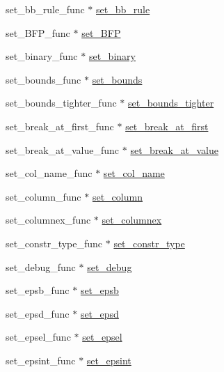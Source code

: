 \begin{DoxyCompactItemize}
\item 
set\+\_\+bb\+\_\+rule\+\_\+func $\ast$ \hyperlink{struct__lprec_ad044e985657bda301e0c0d58c9542f8a}{set\+\_\+bb\+\_\+rule}
\item 
set\+\_\+\+B\+F\+P\+\_\+func $\ast$ \hyperlink{struct__lprec_adceffb271a5c8da2ca201c1030ceb014}{set\+\_\+\+B\+FP}
\item 
set\+\_\+binary\+\_\+func $\ast$ \hyperlink{struct__lprec_a411a10c4f2515e989baddf7dbc456e20}{set\+\_\+binary}
\item 
set\+\_\+bounds\+\_\+func $\ast$ \hyperlink{struct__lprec_a192bb46bdeb1b1ecf686295bda2929a1}{set\+\_\+bounds}
\item 
set\+\_\+bounds\+\_\+tighter\+\_\+func $\ast$ \hyperlink{struct__lprec_a05b16e66be5410ff7cb703bf385b66d3}{set\+\_\+bounds\+\_\+tighter}
\item 
set\+\_\+break\+\_\+at\+\_\+first\+\_\+func $\ast$ \hyperlink{struct__lprec_ad516c0975fdaa94eb36736626b818b7a}{set\+\_\+break\+\_\+at\+\_\+first}
\item 
set\+\_\+break\+\_\+at\+\_\+value\+\_\+func $\ast$ \hyperlink{struct__lprec_a3604c78834e689ea20304034658fb0a8}{set\+\_\+break\+\_\+at\+\_\+value}
\item 
set\+\_\+col\+\_\+name\+\_\+func $\ast$ \hyperlink{struct__lprec_a8614ccbfc05c4ccc6969302c649c9da8}{set\+\_\+col\+\_\+name}
\item 
set\+\_\+column\+\_\+func $\ast$ \hyperlink{struct__lprec_a0c31fe9a2e67a610d6b245f3c80f03e9}{set\+\_\+column}
\item 
set\+\_\+columnex\+\_\+func $\ast$ \hyperlink{struct__lprec_a123f12e7ba717ce9d7dbd6521ca3da0d}{set\+\_\+columnex}
\item 
set\+\_\+constr\+\_\+type\+\_\+func $\ast$ \hyperlink{struct__lprec_ad09648fd6c42c30bf19cd77a8ebee363}{set\+\_\+constr\+\_\+type}
\item 
set\+\_\+debug\+\_\+func $\ast$ \hyperlink{struct__lprec_acbbbedad7d934bfbc75307542484377c}{set\+\_\+debug}
\item 
set\+\_\+epsb\+\_\+func $\ast$ \hyperlink{struct__lprec_a5863f4a4d0234385d506d43d0835767c}{set\+\_\+epsb}
\item 
set\+\_\+epsd\+\_\+func $\ast$ \hyperlink{struct__lprec_adb78c1fff35447746bb72b50c8ca945e}{set\+\_\+epsd}
\item 
set\+\_\+epsel\+\_\+func $\ast$ \hyperlink{struct__lprec_a5ae2b78211334bba3488e01aee1915cd}{set\+\_\+epsel}
\item 
set\+\_\+epsint\+\_\+func $\ast$ \hyperlink{struct__lprec_a77bc31f66519b8d50619bfb8b2834361}{set\+\_\+epsint}

\end{DoxyCompactItemize}
